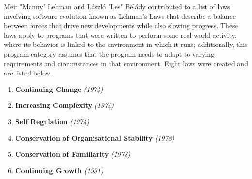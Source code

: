 \documentclass[12pt,conference]{IEEEtran}
\begin{document}
Meir "Manny" Lehman and László "Les" Bélády contributed to a list of laws involving software evolution known as Lehman's Laws that describe a balance between forces that drive new developments while also slowing progress. These laws apply to programs that were written to perform some real-world activity, where its behavior is linked to the environment in which it runs; additionally, this program category assumes that the program needs to adapt to varying requirements and circumstances in that environment. Eight laws were created and are listed below.
\cite{wiki:lehmans-laws}

\vspace{0.25cm}

\begin{enumerate}
    \item \textbf{Continuing Change} \textit{(1974)}
    
    \item \textbf{Increasing Complexity} \textit{(1974)}

    \item \textbf{Self Regulation} \textit{(1974)}

    \item \textbf{Conservation of Organisational Stability} \textit{(1978)}

    \item \textbf{Conservation of Familiarity} \textit{(1978)}

    \item \textbf{Continuing Growth} \textit{(1991)}


\end{enumerate}
\end{document}
